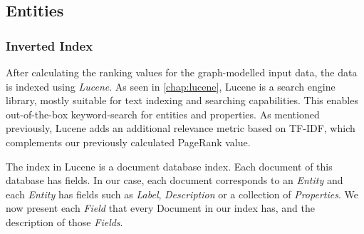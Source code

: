\subsection{Entities}

\subsubsection{Inverted Index}

After calculating the ranking values for the graph-modelled input data, the data is indexed using \textit{Lucene}. 
As seen in \autoref{chap:lucene}, Lucene is a search engine library, mostly suitable for text indexing and searching capabilities. 
This enables out-of-the-box keyword-search for entities and properties.
As mentioned previously, Lucene adds an additional relevance metric based on TF-IDF, which complements our previously calculated PageRank value.

The index in Lucene is a document database index. 
Each document of this database has fields. 
In our case, each document corresponds to an \textit{Entity} and each \textit{Entity} has fields such as \textit{Label}, \textit{Description} or a collection of \textit{Properties}. 
We now present each \textit{Field} that every Document in our index has, and the description of those \textit{Fields}.

